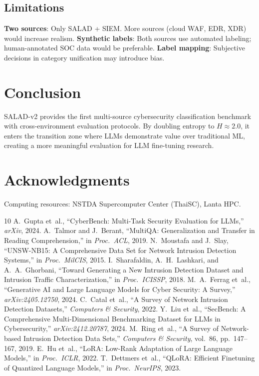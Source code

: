 \documentclass[journal]{IEEEtran}
\begin{document}
\subsection{Limitations}
\textbf{Two sources}: Only SALAD + SIEM. More sources (cloud WAF, EDR, XDR) would increase realism. \textbf{Synthetic labels}: Both sources use automated labeling; human-annotated SOC data would be preferable. \textbf{Label mapping}: Subjective decisions in category unification may introduce bias.

\section{Conclusion}
SALAD-v2 provides the first multi-source cybersecurity classification benchmark with cross-environment evaluation protocols. By doubling entropy to $H\approx2.0$, it enters the transition zone where LLMs demonstrate value over traditional ML, creating a more meaningful evaluation for LLM fine-tuning research.

\section*{Acknowledgments}
Computing resources: NSTDA Supercomputer Center (ThaiSC), Lanta HPC.
\begin{thebibliography}{10}
 A.~Gupta et~al., ``CyberBench: Multi-Task Security Evaluation for LLMs,'' \emph{arXiv}, 2024.
 A.~Talmor and J.~Berant, ``MultiQA: Generalization and Transfer in Reading Comprehension,'' in \emph{Proc.\ ACL}, 2019.
 N.~Moustafa and J.~Slay, ``UNSW-NB15: A Comprehensive Data Set for Network Intrusion Detection Systems,'' in \emph{Proc.\ MilCIS}, 2015.
 I.~Sharafaldin, A.~H.~Lashkari, and A.~A.~Ghorbani, ``Toward Generating a New Intrusion Detection Dataset and Intrusion Traffic Characterization,'' in \emph{Proc.\ ICISSP}, 2018.
 M.~A.~Ferrag et~al., ``Generative AI and Large Language Models for Cyber Security: A Survey,'' \emph{arXiv:2405.12750}, 2024.
 C.~Catal et~al., ``A Survey of Network Intrusion Detection Datasets,'' \emph{Computers \& Security}, 2022.
 Y.~Liu et~al., ``SecBench: A Comprehensive Multi-Dimensional Benchmarking Dataset for LLMs in Cybersecurity,'' \emph{arXiv:2412.20787}, 2024.
 M.~Ring et~al., ``A Survey of Network-based Intrusion Detection Data Sets,'' \emph{Computers \& Security}, vol.~86, pp.~147--167, 2019.
 E.~Hu et~al., ``LoRA: Low-Rank Adaptation of Large Language Models,'' in \emph{Proc.\ ICLR}, 2022.
 T.~Dettmers et~al., ``QLoRA: Efficient Finetuning of Quantized Language Models,'' in \emph{Proc.\ NeurIPS}, 2023.
\end{thebibliography}
\balance
\end{document}
